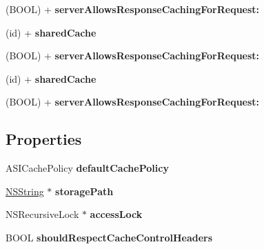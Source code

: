 \begin{DoxyCompactItemize}
\item 
\hypertarget{interface_a_s_i_download_cache_a29ab27733d818070c22611c9cd38a338}{
(\-B\-O\-O\-L) + {\bfseries server\-Allows\-Response\-Caching\-For\-Request\-:}}
\label{interface_a_s_i_download_cache_a29ab27733d818070c22611c9cd38a338}

\item 
\hypertarget{interface_a_s_i_download_cache_aa3f734926635c674880b0b626d3b10e6}{
(id) + {\bfseries shared\-Cache}}
\label{interface_a_s_i_download_cache_aa3f734926635c674880b0b626d3b10e6}

\item 
\hypertarget{interface_a_s_i_download_cache_a29ab27733d818070c22611c9cd38a338}{
(\-B\-O\-O\-L) + {\bfseries server\-Allows\-Response\-Caching\-For\-Request\-:}}
\label{interface_a_s_i_download_cache_a29ab27733d818070c22611c9cd38a338}

\item 
\hypertarget{interface_a_s_i_download_cache_aa3f734926635c674880b0b626d3b10e6}{
(id) + {\bfseries shared\-Cache}}
\label{interface_a_s_i_download_cache_aa3f734926635c674880b0b626d3b10e6}

\item 
\hypertarget{interface_a_s_i_download_cache_a29ab27733d818070c22611c9cd38a338}{
(\-B\-O\-O\-L) + {\bfseries server\-Allows\-Response\-Caching\-For\-Request\-:}}
\label{interface_a_s_i_download_cache_a29ab27733d818070c22611c9cd38a338}

\end{DoxyCompactItemize}
\subsection*{\-Properties}
\begin{DoxyCompactItemize}
\item 
\hypertarget{interface_a_s_i_download_cache_a55cd76635b7c9d6505587b611a73a791}{
\-A\-S\-I\-Cache\-Policy {\bfseries default\-Cache\-Policy}}
\label{interface_a_s_i_download_cache_a55cd76635b7c9d6505587b611a73a791}

\item 
\hypertarget{interface_a_s_i_download_cache_acf2a85a1b71ce10f735e7065b564ddcc}{
\hyperlink{class_n_s_string}{\-N\-S\-String} $\ast$ {\bfseries storage\-Path}}
\label{interface_a_s_i_download_cache_acf2a85a1b71ce10f735e7065b564ddcc}

\item 
\hypertarget{interface_a_s_i_download_cache_a18154dbc5cbfbf7334fe2fee7345b41c}{
\-N\-S\-Recursive\-Lock $\ast$ {\bfseries access\-Lock}}
\label{interface_a_s_i_download_cache_a18154dbc5cbfbf7334fe2fee7345b41c}

\item 
\hypertarget{interface_a_s_i_download_cache_a193b505aa5c910f397cfc5a7d752d563}{
\-B\-O\-O\-L {\bfseries should\-Respect\-Cache\-Control\-Headers}}
\label{interface_a_s_i_download_cache_a193b505aa5c910f397cfc5a7d752d563}

\end{DoxyCompactItemize}


